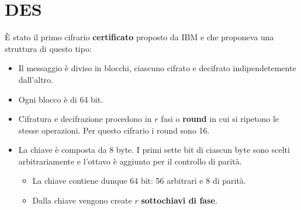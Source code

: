 \section{DES}\label{DES}
\`E stato il primo cifrario \textbf{certificato} proposto da IBM e che proponeva una struttura di questo tipo:
\begin{itemize}
	\item Il messaggio \`e diviso in blocchi, ciascuno cifrato e decifrato indipendetemente dall'altro.
	\item Ogni blocco \`e di 64 bit.
	\item Cifratura e decifrazione procedono in $r$ fasi o \textbf{round} in cui si ripetono le stesse operazioni. Per
	      questo cifrario i round sono 16.
	\item La chiave \`e composta da 8 byte. I primi sette bit di ciascun byte sono scelti arbitrariamente e l'ottavo
	      \`e aggiunto per il controllo di parit\`a.
	      \begin{itemize}
		      \item La chiave contiene dunque 64 bit: 56 arbitrari e 8 di parit\`a.
		      \item Dalla chiave vengono create $r$ \textbf{sottochiavi di fase}.
	      \end{itemize}
\end{itemize}

